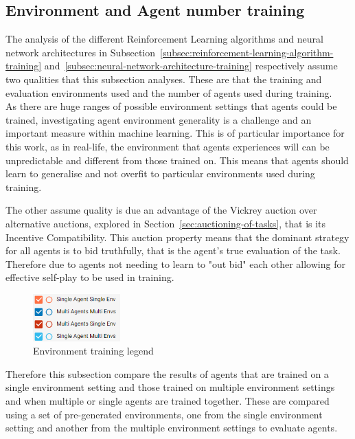 \subsection{Environment and Agent number training}\label{subsec:environment-and-agent-number-training}
The analysis of the different Reinforcement Learning algorithms and neural network architectures in
Subsection~\ref{subsec:reinforcement-learning-algorithm-training} and~\ref{subsec:neural-network-architecture-training}
respectively assume two qualities that this subsection analyses. These are that the training and evaluation environments
used and the number of agents used during training. \\
As there are huge ranges of possible environment settings that agents could be trained, investigating agent environment
generality is a challenge and an important measure within machine learning. This is of particular importance for this
work, as in real-life, the environment that agents experiences will can be unpredictable and different from those
trained on. This means that agents should learn to generalise and not overfit to particular environments used during
training.

The other assume quality is due an advantage of the Vickrey auction over alternative auctions, explored in
Section~\ref{sec:auctioning-of-tasks}, that is its Incentive Compatibility. This auction property means that the
dominant strategy for all agents is to bid truthfully, that is the agent's true evaluation of the task. Therefore due
to agents not needing to learn to "out bid" each other allowing for effective self-play to be used in training.

\begin{figure}
    \includegraphics[width=0.3\textwidth]{figures/4_test_eval_figs/env_training_fig/legend.png}
    \caption{Environment training legend}
    \label{fig:env-training-legend}
\end{figure}

Therefore this subsection compare the results of agents that are trained on a single environment setting and those
trained on multiple environment settings and when multiple or single agents are trained together. These are compared
using a set of pre-generated environments, one from the single environment setting and another from the multiple
environment settings to evaluate agents.

